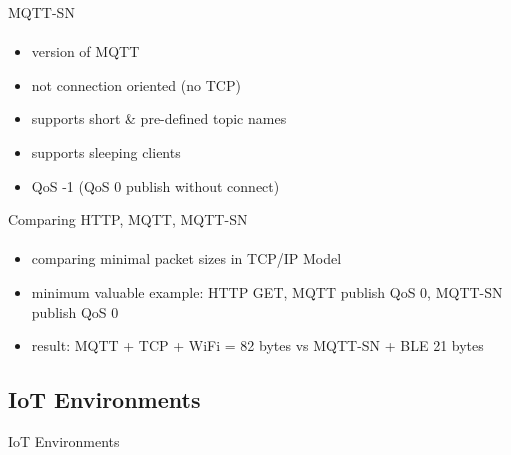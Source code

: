 \documentclass[10pt,aspectratio=\ratio,
compress
]{beamer}
\begin{document}
\begin{frame}{MQTT-SN}\framesubtitle{}
	\begin{itemize}
		\item version of MQTT
		\item not connection oriented (no TCP)
		\item supports short \& pre-defined topic names
		\item supports sleeping clients
		\item QoS -1 (QoS 0 publish without connect)
	\end{itemize}
\end{frame}


\begin{frame}{Comparing HTTP, MQTT, MQTT-SN}\framesubtitle{}
	\begin{itemize}
		\item comparing minimal packet sizes in TCP/IP Model
		\item minimum valuable example:	HTTP GET, MQTT publish QoS 0, MQTT-SN publish QoS 0
		\item result: MQTT + TCP + WiFi = 82 bytes vs MQTT-SN + BLE 21 bytes
	\end{itemize}
\end{frame}


\subsection{IoT Environments}
\begin{frame}{IoT Environments}\framesubtitle{}
\end{frame}
\end{document}
